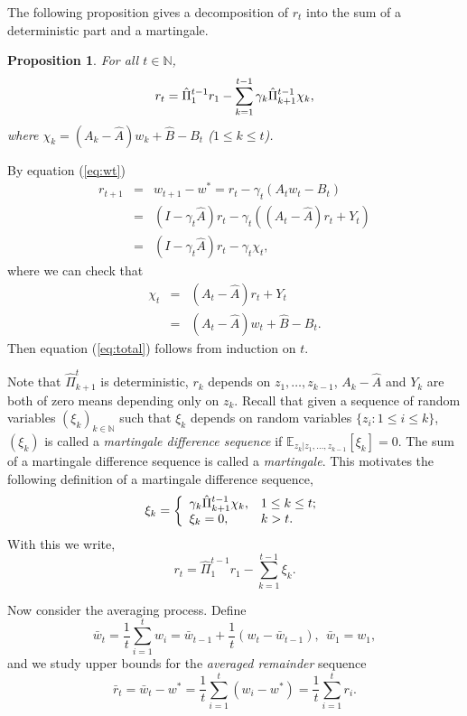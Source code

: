 \documentclass[twoside,twocolumn,journal]{IEEEtran}
\newtheorem{prop}[thm]{Proposition}
\newenvironment{pf}[1][Proof]{\medskip\noindent\hspace{1em}{\itshape #1: }}{\hspace*{\fill}~\QED\par\endtrivlist\medskip}
\def\N{{\mathbb N}}
\def\E{{\mathbb E}}        %
\begin{document}
The following proposition gives a decomposition of $r_t$ into the sum of a deterministic part and a martingale.

\medskip

\begin{prop} For all $t\in \N$,
\begin{equation} \label{eq:total}
r_{t} = \hat{\Pi}_1^{t-1} r_1 -
\sum_{k=1}^{t-1}\gamma_k  \Hat{\Pi}_{k+1}^{t-1} \chi_k,
\end{equation}
where $\chi_k=(A_k - \hat{A}) w_k + \hat{B}-B_t$ ($1\leq k \leq t$).
\end{prop}

\begin{pf} By equation (\ref{eq:wt})
\begin{eqnarray*}
r_{t+1} & = & w_{t+1}-w^\ast = r_{t} - \gamma_{t} (A_{t} w_{t} - B_{t}) \\
& = & (I - \gamma_t \hat{A}) r_t  - \gamma_t ((A_t-\hat{A})r_t + Y_t ) \\
& = & (I - \gamma_t \hat{A}) r_t - \gamma_t \chi_t,
\end{eqnarray*}
where we can check that
\begin{eqnarray*}
\chi_t & = & (A_t - \hat{A})r_t + Y_t \\
&  = & (A_t - \hat{A}) w_t + \hat{B}- B_t.
\end{eqnarray*}
Then equation (\ref{eq:total}) follows from induction on $t$.
\end{pf}

Note that $\hat{\Pi}_{k+1}^t$ is deterministic, $r_k$ depends on
$z_1,\dots,z_{k-1}$, $A_k-\hat{A}$ and $Y_k$ are both of zero
means depending only on $z_k$. Recall that given a sequence of random variables $(\xi_k)_{k\in \N}$ such that $\xi_k$ depends on
random variables $\{z_i:1\leq i \leq k\}$, $(\xi_k)$ is called a \emph{martingale difference sequence}
if $\E_{z_k|z_1,\ldots,z_{k-1}}[\xi_k]=0$. The sum of a martingale difference sequence is called a \emph{martingale}. This motivates
the following definition of a martingale difference sequence,
\[
\xi_k = \left\{
\begin{array}{ll}
\gamma_k \Hat{\Pi}_{k+1}^{t-1} \chi_k, & 1\leq k\leq t; \\
\xi_k=0, & k> t.
\end{array}
\right.
\]
With this we write,
\begin{equation} \label{eq:total1}
r_{t} = \hat{\Pi}_1^{t-1} r_1 - \sum_{k=1}^{t-1}\xi_k.
\end{equation}

Now consider the averaging process. Define
\[ \bar{w}_{t} = \frac{1}{t}\sum_{i=1}^t w_i=\bar{w}_{t-1} + \frac{1}{t} (w_t-\bar{w}_{t-1}), \ \ \bar{w}_1=w_1, \]
and we study upper bounds for the \emph{averaged remainder} sequence
\[ \bar{r}_{t} = \bar{w}_{t} - w^\ast = \frac{1}{t} \sum_{i=1}^{t} (w_i - w^\ast) = \frac{1}{t} \sum_{i=1}^{t} r_i. \]
\end{document}
